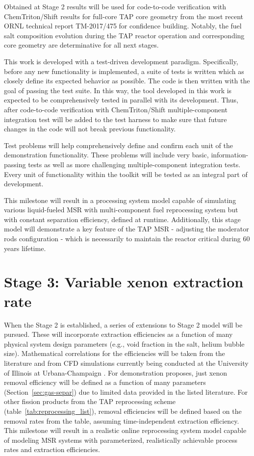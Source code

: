 Obtained at Stage 2 results will be used for code-to-code verification with  
ChemTriton/Shift results for full-core \gls{TAP} core geometry from the most 
recent \gls{ORNL} technical report TM-2017/475 \cite{betzler_assessment_2017} 
for confidence building. Notably, the fuel salt composition evolution during 
the \gls{TAP} reactor operation and corresponding core geometry are 
determinative for all next stages.

This work is developed with a test-driven development paradigm. Specifically, 
before any new functionality is implemented, a suite of tests is written which 
as closely define its expected behavior as possible. The code is then written 
with the goal of passing the test suite. In this way, the tool developed in 
this work is expected to be comprehensively tested in parallel with its 
development. Thus, after code-to-code verification with ChemTriton/Shift 
multiple-component integration test will be added to the test harness to make 
sure that future changes in the code will not break previous functionality.

Test problems will help comprehensively define and confirm each unit of the 
demonstration functionality. These problems will include very basic, 
information-passing tests as well as more challenging multiple-component 
integration tests. Every unit of functionality within the toolkit will be 
tested as an integral part of development.

This milestone will result in a processing system model capable of simulating
various liquid-fueled \gls{MSR} with multi-component fuel reprocessing system 
but with constant separation efficiency, defined at runtime. Additionally, 
this stage model will demonstrate a key feature of the \gls{TAP} \gls{MSR} - 
adjusting the moderator rods configuration - which is necessarily to maintain 
the reactor critical during 60 years lifetime. 

\section{Stage 3: Variable xenon extraction rate}
When the Stage 2 is established, a series of extensions to Stage 2 model will 
be pursued. These will incorporate extraction efficiencies as a function of 
many physical system design parameters (e.g., void fraction in the salt, 
helium bubble size). Mathematical correlations for the efficiencies will be 
taken from the literature \cite{peebles_removal_1968, 
gabbard_development_1974} and from CFD simulations currently being conducted 
at the University of Illinois at Urbana-Champaign \cite{huff_enabling_2018}. 
For demonstration proposes, just xenon removal efficiency will be defined as a 
function of many parameters (Section~\ref{sec:gas-separ}) due to 
limited data provided in the listed literature. For other fission products  
from the \gls{TAP} reprocessing scheme (table~\ref{tab:reprocessing_list}), 
removal efficiencies will be defined based on the removal rates from the 
table, assuming time-independent extraction efficiency. This milestone will 
result in a realistic online reprocessing system model capable of modeling 
\gls{MSR} systems with parameterized, realistically achievable process rates 
and extraction efficiencies.

